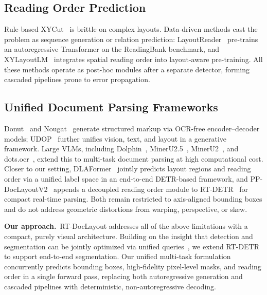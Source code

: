 \documentclass[11pt, a4paper,logo,  copyright, nonumbering]{paddleocr}
\begin{document}
\subsection{Reading Order Prediction}

Rule-based XYCut~\cite{ha1995recursive} is brittle on complex layouts. Data-driven methods cast the problem as sequence generation or relation prediction: LayoutReader~\cite{wang2021layoutreaderpretrainingtextlayout} pre-trains an autoregressive Transformer on the ReadingBank benchmark, and XYLayoutLM~\cite{gu2022xylayoutlmlayoutawaremultimodalnetworks} integrates spatial reading order into layout-aware pre-training. All these methods operate as post-hoc modules after a separate detector, forming cascaded pipelines prone to error propagation.

\subsection{Unified Document Parsing Frameworks}

Donut~\cite{kim2022ocrfreedocumentunderstandingtransformer} and Nougat~\cite{blecher2023nougatneuralopticalunderstanding} generate structured markup via OCR-free encoder--decoder models; UDOP~\cite{tang2023unifyingvisiontextlayout} further unifies vision, text, and layout in a generative framework. Large VLMs, including Dolphin~\cite{feng2025dolphindocumentimageparsing}, MinerU2.5~\cite{niu2025mineru25decoupledvisionlanguagemodel}, MinerU2~\cite{MinerU2}, and dots.ocr~\cite{li2025dotsocrmultilingualdocumentlayout}, extend this to multi-task document parsing at high computational cost. Closer to our setting, DLAFormer~\cite{wang2024dlaformerendtoendtransformerdocument} jointly predicts layout regions and reading order via a unified label space in an end-to-end DETR-based framework, and PP-DocLayoutV2~\cite{cui2025paddleocrvlboostingmultilingualdocument} appends a decoupled reading order module to RT-DETR~\cite{zhao2024detrsbeatyolosrealtime} for compact real-time parsing. Both remain restricted to axis-aligned bounding boxes and do not address geometric distortions from warping, perspective, or skew.

\textbf{Our approach.}~RT-DocLayout addresses all of the above limitations with a compact, purely visual architecture. Building on the insight that detection and segmentation can be jointly optimized via unified queries~\cite{li2022maskdinounifiedtransformerbased}, we extend RT-DETR~\cite{zhao2024detrsbeatyolosrealtime} to support end-to-end segmentation. Our unified multi-task formulation concurrently predicts bounding boxes, high-fidelity pixel-level masks, and reading order in a single forward pass, replacing both autoregressive generation and cascaded pipelines with deterministic, non-autoregressive decoding.
\end{document}
